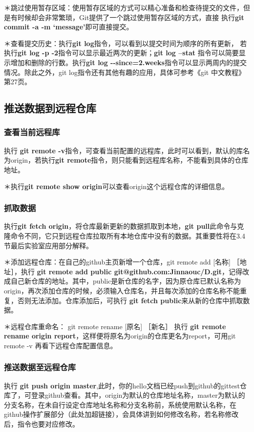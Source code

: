 \documentclass{article}
\begin{document}
＊跳过使用暂存区域：使用暂存区域的方式可以精心准备和检查待提交的文件，但是有时候却会非常繁琐，Git提供了一个跳过使用暂存区域的方式，直接 执行\textbf{git commit -a -m `message'}即可直接提交。 

＊查看提交历史：执行\textbf{git log}指令，可以看到以提交时间为顺序的所有更新， 若执行\textbf{git log -p -2}指令可以显示最近两次的更新；\textbf{git log --stat} 指令可以简要显示增加和删除的行数。执行\textbf{git log {-}{-}since=2.weeks}指令可以显示两周内的提交情况。除此之外，git log指令还有其他有趣的应用，具体可参考《git 中文教程》 第27页。

\subsection{推送数据到远程仓库}
\subsubsection{查看当前远程库}
执行 \textbf{git remote -v}指令，可查看当前配置的远程库，此时可以看到，默认的库名为origin，若执行\textbf{git remote}指令，则只能看到远程库名称，不能看到具体的仓库地址。

＊执行\textbf{git remote show origin}可以查看origin这个远程仓库的详细信息。

\subsubsection{抓取数据}
执行\textbf{git fetch origin}，将仓库最新更新的数据抓取到本地，\textbf{git pull}此命令与克隆命令不同，它只到远程仓库拉取所有本地仓库中没有的数据。其重要性将在3.4节最后实验室应用部分解释。

＊添加远程仓库：在自己的github主页新增一个仓库，git remote add [名称] ［地址］，执行 \textbf{git remote add public git@github.com:Jinnaouc/D.git}，记得改成自己新仓库的地址。其中，public是新仓库的名字，因为原仓库已默认名称为origin，再次添加仓库的时候，必须输入仓库名，并且每次添加的仓库名称不能重复，否则无法添加。仓库添加后，可执行 \textbf{git fetch public}来从新的仓库中抓取数据。

＊远程仓库重命名： git remote rename [原名] ［新名］ 执行 \textbf{git remote rename origin report}，这样便将原名为origin的仓库更名为report，可用git remote -v 再看下远程仓库配置信息。
\subsubsection{推送数据至远程仓库}
执行 \textbf{git push origin master},此时，你的hello文档已经push到github的gittest仓库了，可登录github查看。其中，origin为默认的仓库地址名称，master为默认的分支名称，在未自行设定仓库地址名称和分支名称前，系统使用默认名称，在github操作扩展部分（此处加超链接），会具体讲到如何修改名称，若名称修改后，指令也要对应修改。
\end{document}
